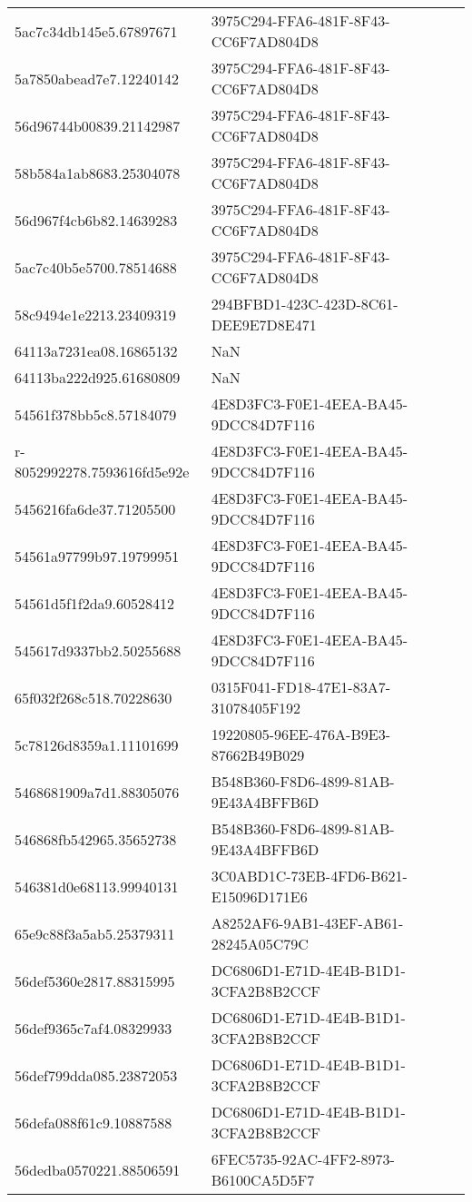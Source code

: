 \begin{tabular}{ll}
5ac7c34db145e5.67897671 & 3975C294-FFA6-481F-8F43-CC6F7AD804D8 \\
5a7850abead7e7.12240142 & 3975C294-FFA6-481F-8F43-CC6F7AD804D8 \\
56d96744b00839.21142987 & 3975C294-FFA6-481F-8F43-CC6F7AD804D8 \\
58b584a1ab8683.25304078 & 3975C294-FFA6-481F-8F43-CC6F7AD804D8 \\
56d967f4cb6b82.14639283 & 3975C294-FFA6-481F-8F43-CC6F7AD804D8 \\
5ac7c40b5e5700.78514688 & 3975C294-FFA6-481F-8F43-CC6F7AD804D8 \\
58c9494e1e2213.23409319 & 294BFBD1-423C-423D-8C61-DEE9E7D8E471 \\
64113a7231ea08.16865132 & NaN \\
64113ba222d925.61680809 & NaN \\
54561f378bb5c8.57184079 & 4E8D3FC3-F0E1-4EEA-BA45-9DCC84D7F116 \\
r-8052992278.7593616fd5e92e & 4E8D3FC3-F0E1-4EEA-BA45-9DCC84D7F116 \\
5456216fa6de37.71205500 & 4E8D3FC3-F0E1-4EEA-BA45-9DCC84D7F116 \\
54561a97799b97.19799951 & 4E8D3FC3-F0E1-4EEA-BA45-9DCC84D7F116 \\
54561d5f1f2da9.60528412 & 4E8D3FC3-F0E1-4EEA-BA45-9DCC84D7F116 \\
545617d9337bb2.50255688 & 4E8D3FC3-F0E1-4EEA-BA45-9DCC84D7F116 \\
65f032f268c518.70228630 & 0315F041-FD18-47E1-83A7-31078405F192 \\
5c78126d8359a1.11101699 & 19220805-96EE-476A-B9E3-87662B49B029 \\
5468681909a7d1.88305076 & B548B360-F8D6-4899-81AB-9E43A4BFFB6D \\
546868fb542965.35652738 & B548B360-F8D6-4899-81AB-9E43A4BFFB6D \\
546381d0e68113.99940131 & 3C0ABD1C-73EB-4FD6-B621-E15096D171E6 \\
65e9c88f3a5ab5.25379311 & A8252AF6-9AB1-43EF-AB61-28245A05C79C \\
56def5360e2817.88315995 & DC6806D1-E71D-4E4B-B1D1-3CFA2B8B2CCF \\
56def9365c7af4.08329933 & DC6806D1-E71D-4E4B-B1D1-3CFA2B8B2CCF \\
56def799dda085.23872053 & DC6806D1-E71D-4E4B-B1D1-3CFA2B8B2CCF \\
56defa088f61c9.10887588 & DC6806D1-E71D-4E4B-B1D1-3CFA2B8B2CCF \\
56dedba0570221.88506591 & 6FEC5735-92AC-4FF2-8973-B6100CA5D5F7 \\

\end{tabular}
